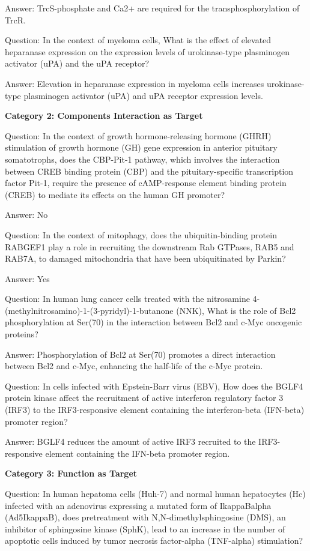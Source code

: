 Answer: TrcS-phosphate and Ca2+ are required for the transphosphorylation of TrcR.

Question: In the context of myeloma cells, What is the effect of elevated heparanase expression on the expression levels of urokinase-type plasminogen activator (uPA) and the uPA receptor?

Answer: Elevation in heparanase expression in myeloma cells increases urokinase-type plasminogen activator (uPA) and uPA receptor expression levels.


\textbf{Category 2: Components Interaction as Target} 

Question: In the context of growth hormone-releasing hormone (GHRH) stimulation of growth hormone (GH) gene expression in anterior pituitary somatotrophs, does the CBP-Pit-1 pathway, which involves the interaction between CREB binding protein (CBP) and the pituitary-specific transcription factor Pit-1, require the presence of cAMP-response element binding protein (CREB) to mediate its effects on the human GH promoter?

Answer: No

Question: In the context of mitophagy, does the ubiquitin-binding protein RABGEF1 play a role in recruiting the downstream Rab GTPases, RAB5 and RAB7A, to damaged mitochondria that have been ubiquitinated by Parkin?

Answer: Yes

Question: In human lung cancer cells treated with the nitrosamine 4-(methylnitrosamino)-1-(3-pyridyl)-1-butanone (NNK), What is the role of Bcl2 phosphorylation at Ser(70) in the interaction between Bcl2 and c-Myc oncogenic proteins?


Answer: Phosphorylation of Bcl2 at Ser(70) promotes a direct interaction between Bcl2 and c-Myc, enhancing the half-life of the c-Myc protein.


Question: In cells infected with Epstein-Barr virus (EBV), How does the BGLF4 protein kinase affect the recruitment of active interferon regulatory factor 3 (IRF3) to the IRF3-responsive element containing the interferon-beta (IFN-beta) promoter region?

Answer: BGLF4 reduces the amount of active IRF3 recruited to the IRF3-responsive element containing the IFN-beta promoter region.

\textbf{Category 3: Function as Target}


Question: In human hepatoma cells (Huh-7) and normal human hepatocytes (Hc) infected with an adenovirus expressing a mutated form of IkappaBalpha (Ad5IkappaB), does pretreatment with N,N-dimethylsphingosine (DMS), an inhibitor of sphingosine kinase (SphK), lead to an increase in the number of apoptotic cells induced by tumor necrosis factor-alpha (TNF-alpha) stimulation?

